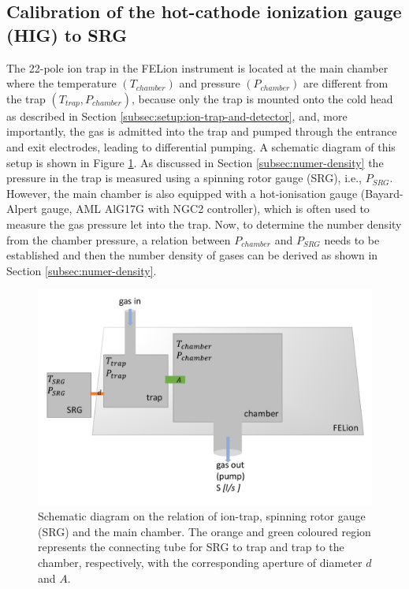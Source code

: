 \subsection{Calibration of the hot-cathode ionization gauge (HIG) to SRG}
\label{subsec:calibration:HIG-SRG}

The 22-pole ion trap in the FELion instrument is located at the main chamber
where the temperature $(T_{chamber})$ and pressure $(P_{chamber})$ are
different from the trap $(T_{trap}, P_{chamber})$, because only the trap is
mounted onto the cold head as described in Section
\ref{subsec:setup:ion-trap-and-detector}, and, more importantly, the gas is
admitted into the trap and pumped through the entrance and exit electrodes,
leading to differential pumping. A schematic diagram of this setup is shown
in Figure \ref{fig:HIG}. As discussed in Section \ref{subsec:numer-density} the
pressure in the trap is measured using a spinning rotor gauge (SRG), i.e.,
$P_{SRG}$. However, the main chamber is also equipped with a hot-ionisation
gauge (Bayard-Alpert gauge, AML AlG17G with NGC2 controller), which is often
used to measure the gas pressure let into the trap. Now, to determine the
number density from the chamber pressure, a relation between $P_{chamber}$ and
$P_{SRG}$ needs to be established and then the number density of gases can be
derived as shown in Section \ref{subsec:numer-density}.\\

\begin{figure}[!htb]
    \centering
    \includegraphics[scale=0.5]{figures/Instruments/HIG calibration.pdf}
    \caption{Schematic diagram on the relation of ion-trap, spinning rotor gauge (SRG) and the main chamber. The orange and green coloured region represents the connecting tube for SRG to trap and trap to the chamber, respectively, with the corresponding aperture of diameter $d$ and $A$.}
    \label{fig:HIG}
\end{figure}

